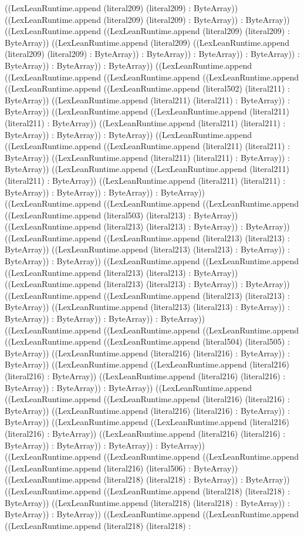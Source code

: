 \documentclass[11pt]{article}
\begin{document}
((LexLeanRuntime.append (literal209) (literal209) : ByteArray)) ((LexLeanRuntime.append (literal209) (literal209) : ByteArray)) : ByteArray)) ((LexLeanRuntime.append ((LexLeanRuntime.append (literal209) (literal209) : ByteArray)) ((LexLeanRuntime.append (literal209) ((LexLeanRuntime.append (literal209) (literal209) : ByteArray)) : ByteArray)) : ByteArray)) : ByteArray)) : ByteArray)) : ByteArray)) : ByteArray)) ((LexLeanRuntime.append ((LexLeanRuntime.append ((LexLeanRuntime.append ((LexLeanRuntime.append ((LexLeanRuntime.append ((LexLeanRuntime.append (literal502) (literal211) : ByteArray)) ((LexLeanRuntime.append (literal211) (literal211) : ByteArray)) : ByteArray)) ((LexLeanRuntime.append ((LexLeanRuntime.append (literal211) (literal211) : ByteArray)) ((LexLeanRuntime.append (literal211) (literal211) : ByteArray)) : ByteArray)) : ByteArray)) ((LexLeanRuntime.append ((LexLeanRuntime.append ((LexLeanRuntime.append (literal211) (literal211) : ByteArray)) ((LexLeanRuntime.append (literal211) (literal211) : ByteArray)) : ByteArray)) ((LexLeanRuntime.append ((LexLeanRuntime.append (literal211) (literal211) : ByteArray)) ((LexLeanRuntime.append (literal211) (literal211) : ByteArray)) : ByteArray)) : ByteArray)) : ByteArray)) ((LexLeanRuntime.append ((LexLeanRuntime.append ((LexLeanRuntime.append ((LexLeanRuntime.append (literal503) (literal213) : ByteArray)) ((LexLeanRuntime.append (literal213) (literal213) : ByteArray)) : ByteArray)) ((LexLeanRuntime.append ((LexLeanRuntime.append (literal213) (literal213) : ByteArray)) ((LexLeanRuntime.append (literal213) (literal213) : ByteArray)) : ByteArray)) : ByteArray)) ((LexLeanRuntime.append ((LexLeanRuntime.append ((LexLeanRuntime.append (literal213) (literal213) : ByteArray)) ((LexLeanRuntime.append (literal213) (literal213) : ByteArray)) : ByteArray)) ((LexLeanRuntime.append ((LexLeanRuntime.append (literal213) (literal213) : ByteArray)) ((LexLeanRuntime.append (literal213) (literal213) : ByteArray)) : ByteArray)) : ByteArray)) : ByteArray)) : ByteArray)) ((LexLeanRuntime.append ((LexLeanRuntime.append ((LexLeanRuntime.append ((LexLeanRuntime.append ((LexLeanRuntime.append (literal504) (literal505) : ByteArray)) ((LexLeanRuntime.append (literal216) (literal216) : ByteArray)) : ByteArray)) ((LexLeanRuntime.append ((LexLeanRuntime.append (literal216) (literal216) : ByteArray)) ((LexLeanRuntime.append (literal216) (literal216) : ByteArray)) : ByteArray)) : ByteArray)) ((LexLeanRuntime.append ((LexLeanRuntime.append ((LexLeanRuntime.append (literal216) (literal216) : ByteArray)) ((LexLeanRuntime.append (literal216) (literal216) : ByteArray)) : ByteArray)) ((LexLeanRuntime.append ((LexLeanRuntime.append (literal216) (literal216) : ByteArray)) ((LexLeanRuntime.append (literal216) (literal216) : ByteArray)) : ByteArray)) : ByteArray)) : ByteArray)) ((LexLeanRuntime.append ((LexLeanRuntime.append ((LexLeanRuntime.append ((LexLeanRuntime.append (literal216) (literal506) : ByteArray)) ((LexLeanRuntime.append (literal218) (literal218) : ByteArray)) : ByteArray)) ((LexLeanRuntime.append ((LexLeanRuntime.append (literal218) (literal218) : ByteArray)) ((LexLeanRuntime.append (literal218) (literal218) : ByteArray)) : ByteArray)) : ByteArray)) ((LexLeanRuntime.append ((LexLeanRuntime.append ((LexLeanRuntime.append (literal218) (literal218) : 
\end{document}
